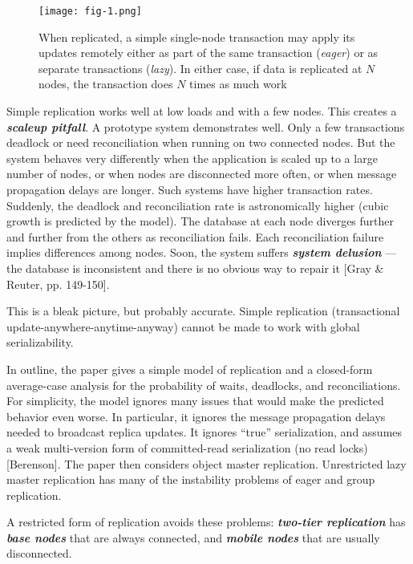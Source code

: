 \documentclass[a4paper,11pt,twoside,openright]{article}
\begin{document}
\begin{figure}
  \centering
  \texttt{[image: fig-1.png]}
  \caption{When replicated, a simple single-node transaction may
  apply its updates remotely either as part of the same transaction
  (\emph{eager}) or as separate transactions (\emph{lazy}). In either
  case, if data is replicated at \(N\) nodes, the transaction does
  \(N\) times as much work}
\end{figure}

Simple replication works well at low loads and with a few nodes. This
creates a \emph{\textbf{scaleup pitfall}}. A prototype system
demonstrates well. Only a few transactions deadlock or need
reconciliation when running on two connected nodes. But the system
behaves very differently when the application is scaled up to a large
number of nodes, or when nodes are disconnected more often, or when
message propagation delays are longer. Such systems have higher
transaction rates. Suddenly, the deadlock and reconciliation rate is
astronomically higher (cubic growth is predicted by the model). The
database at each node diverges further and further from the others as
reconciliation fails. Each reconciliation failure implies differences
among nodes. Soon, the system suffers \textbf{\emph{system delusion}}
--- the database is inconsistent and there is no obvious way to repair
it {[}Gray \& Reuter, pp. 149-150{]}.

This is a bleak picture, but probably accurate. Simple replication
(transactional update-anywhere-anytime-anyway) cannot be made to work
with global serializability.

In outline, the paper gives a simple model of replication and a
closed-form average-case analysis for the probability of waits,
deadlocks, and reconciliations. For simplicity, the model ignores many
issues that would make the predicted behavior even worse. In particular,
it ignores the message propagation delays needed to broadcast replica
updates. It ignores ``true'' serialization, and assumes a weak
multi-version form of committed-read serialization (no read locks)
{[}Berenson{]}. The paper then considers object master replication.
Unrestricted lazy master replication has many of the instability
problems of eager and group replication.

A restricted form of replication avoids these problems:
\emph{\textbf{two-tier replication}} has \emph{\textbf{base nodes}} that
are always connected, and \emph{\textbf{mobile nodes}} that are usually
disconnected.
\end{document}
